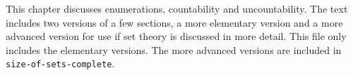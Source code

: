\documentclass[../../../include/open-logic-chapter]{subfiles}
\begin{document}

\begin{editorial}
This chapter discusses enumerations, countability and uncountability.
The text includes two versions of a few sections, a more elementary
version and a more advanced version for use if set theory is
discussed in more detail. This file only includes the elementary
versions. The more advanced versions are included in \verb|size-of-sets-complete|.
\end{editorial}











\OLEndChapterHook
\end{document}
